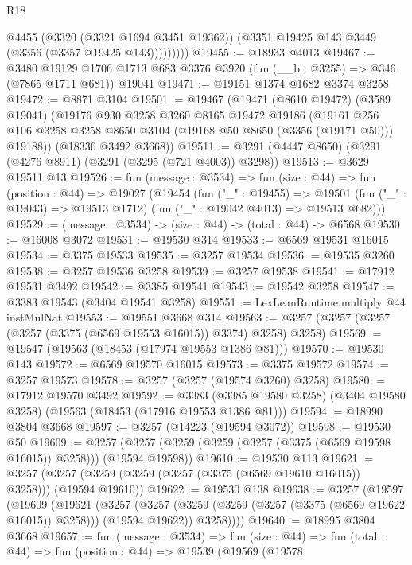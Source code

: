 \begin{lexlean}{R18}
\begin{coremodule}
                @4455
                (@3320 (@3321 @1694 @3451 @19362))
                (@3351 @19425 @143 @3449 (@3356 (@3357 @19425 @143)))))))))
@19455 := @18933 @4013
@19467 := @3480
    @19129
    @1706
    @1713
    @683
    @3376
    @3920
    (fun (__b : @3255) => @346 (@7865 @1711 @681))
    @19041
@19471 := @19151 @1374 @1682 @3374 @3258
@19472 := @8871 @3104
@19501 := @19467
    (@19471
      (@8610 @19472)
      (@3589 @19041)
      (@19176
        @930
        @3258
        @3260
        @8165
        @19472
        @19186
        (@19161 @256 @106 @3258 @3258 @8650 @3104 (@19168 @50 @8650 (@3356 (@19171 @50))) @19188))
      (@18336 @3492 @3668))
@19511 := @3291 (@4447 @8650) (@3291 (@4276 @8911) (@3291 (@3295 (@721 @4003)) @3298))
@19513 := @3629 @19511 @13
@19526 := fun (message : @3534) =>
  fun (size : @44) =>
  fun (position : @44) =>
  @19027
    (@19454
      (fun ("_" : @19455) =>
      @19501 (fun ("_" : @19043) => @19513 @1712) (fun ("_" : @19042 @4013) => @19513 @682)))
@19529 := (message : @3534) -> (size : @44) -> (total : @44) -> @6568
@19530 := @16008 @3072
@19531 := @19530 @314
@19533 := @6569 @19531 @16015
@19534 := @3375 @19533
@19535 := @3257 @19534
@19536 := @19535 @3260
@19538 := @3257 @19536 @3258
@19539 := @3257 @19538
@19541 := @17912 @19531 @3492
@19542 := @3385 @19541
@19543 := @19542 @3258
@19547 := @3383 @19543 (@3404 @19541 @3258)
@19551 := LexLeanRuntime.multiply @44 instMulNat
@19553 := @19551 @3668 @314
@19563 := @3257 (@3257 (@3257 (@3257 (@3375 (@6569 @19553 @16015)) @3374) @3258) @3258)
@19569 := @19547 (@19563 (@18453 (@17974 @19553 @1386 @81)))
@19570 := @19530 @143
@19572 := @6569 @19570 @16015
@19573 := @3375 @19572
@19574 := @3257 @19573
@19578 := @3257 (@3257 (@19574 @3260) @3258)
@19580 := @17912 @19570 @3492
@19592 := @3383
    (@3385 @19580 @3258)
    (@3404 @19580 @3258)
    (@19563 (@18453 (@17916 @19553 @1386 @81)))
@19594 := @18990 @3804 @3668
@19597 := @3257 (@14223 (@19594 @3072))
@19598 := @19530 @50
@19609 := @3257 (@3257 (@3259 (@3259 (@3257 (@3375 (@6569 @19598 @16015)) @3258))) (@19594 @19598))
@19610 := @19530 @113
@19621 := @3257 (@3257 (@3259 (@3259 (@3257 (@3375 (@6569 @19610 @16015)) @3258))) (@19594 @19610))
@19622 := @19530 @138
@19638 := @3257
    (@19597
      (@19609
        (@19621
          (@3257
            (@3257 (@3259 (@3259 (@3257 (@3375 (@6569 @19622 @16015)) @3258))) (@19594 @19622))
            @3258))))
@19640 := @18995 @3804 @3668
@19657 := fun (message : @3534) =>
  fun (size : @44) =>
  fun (total : @44) =>
  fun (position : @44) =>
  @19539
    (@19569
      (@19578

\end{coremodule}
\end{lexlean}
